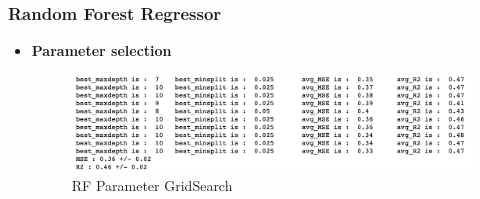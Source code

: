 \documentclass{article}
\begin{document}
\subsubsection{Random Forest Regressor}

\begin{itemize}
\item \textbf{Parameter selection}

\begin{figure}[H]
\centering
\includegraphics[scale=0.4]{"rforest_param"}
\caption{RF Parameter GridSearch}
\end{figure}


\end{itemize}
\end{document}
